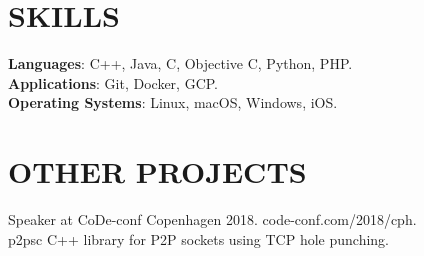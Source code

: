 \documentclass[overlapped,12pt]{res}
\begin{document}
\begin{resume}
\section{SKILLS}
\textbf{Languages}: C++, Java, C, Objective C, Python, PHP.\\
\textbf{Applications}: Git, Docker, GCP.\\
\textbf{Operating Systems}: Linux, macOS, Windows, iOS.

\section{OTHER PROJECTS}
Speaker at CoDe-conf Copenhagen 2018. code-conf.com/2018/cph.\\
p2psc C++ library for P2P sockets using TCP hole punching.
\end{resume}
\end{document}
